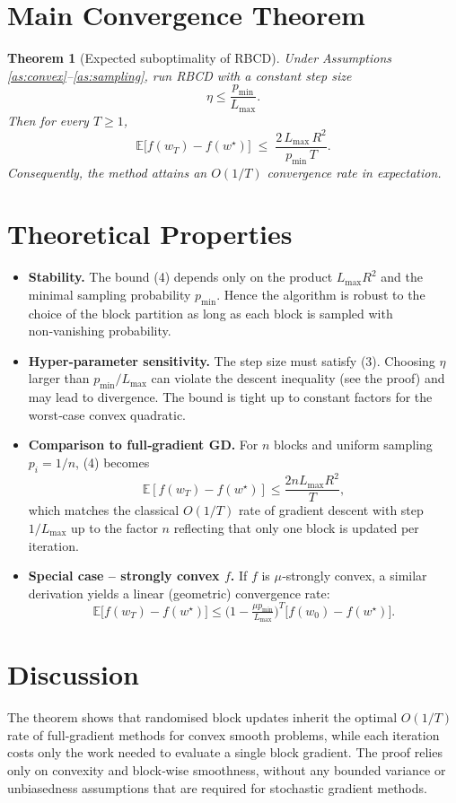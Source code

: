 \documentclass[11pt]{article}
\newtheorem{theorem}{Theorem}
\newcommand{\E}{\mathbb{E}}
\begin{document}
\section*{Main Convergence Theorem}
\begin{theorem}[Expected suboptimality of RBCD]\label{thm:main}
Under Assumptions \ref{as:convex}–\ref{as:sampling}, run RBCD with a \emph{constant} step size
\[
\eta \le \frac{p_{\min}}{L_{\max}} .
\tag{3}
\]
Then for every $T\ge 1$,
\[
\E\!\bigl[f(w_T)-f(w^\star)\bigr]\;\le\;
\frac{2\,L_{\max}\,R^2}{p_{\min}\,T}.
\tag{4}
\]
Consequently, the method attains an $O(1/T)$ convergence rate in expectation.
\end{theorem}

\section*{Theoretical Properties}
\begin{itemize}[leftmargin=*]
    \item \textbf{Stability.} The bound (4) depends only on the product $L_{\max}R^2$ and the minimal sampling probability $p_{\min}$. Hence the algorithm is robust to the choice of the block partition as long as each block is sampled with non‑vanishing probability.
    \item \textbf{Hyper‑parameter sensitivity.} The step size must satisfy (3). Choosing $\eta$ larger than $p_{\min}/L_{\max}$ can violate the descent inequality (see the proof) and may lead to divergence. The bound is tight up to constant factors for the worst‑case convex quadratic.
    \item \textbf{Comparison to full‑gradient GD.} For $n$ blocks and uniform sampling $p_i=1/n$, (4) becomes
    \[
    \E[f(w_T)-f(w^\star)]\le \frac{2n L_{\max}R^2}{T},
    \]
    which matches the classical $O(1/T)$ rate of gradient descent with step $1/L_{\max}$ up to the factor $n$ reflecting that only one block is updated per iteration.
    \item \textbf{Special case – strongly convex $f$.} If $f$ is $\mu$‑strongly convex, a similar derivation yields a linear (geometric) convergence rate:
    \[
    \E\!\bigl[f(w_T)-f(w^\star)\bigr]\le \bigl(1-\tfrac{\mu p_{\min}}{L_{\max}}\bigr)^{T}\!\bigl[f(w_0)-f(w^\star)\bigr].
    \]
\end{itemize}

\section*{Discussion}
The theorem shows that randomised block updates inherit the optimal $O(1/T)$ rate of full‑gradient methods for convex smooth problems, while each iteration costs only the work needed to evaluate a single block gradient. The proof relies only on convexity and block‑wise smoothness, without any bounded variance or unbiasedness assumptions that are required for stochastic gradient methods.
\end{document}
